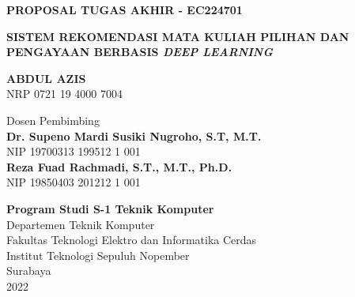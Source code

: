 {

\textbf{\large PROPOSAL TUGAS AKHIR - EC224701}

\vspace{2cm}

\begin{Large}
    \uppercase{\textbf{Sistem rekomendasi Mata Kuliah Pilihan dan Pengayaan berbasis \emph{Deep Learning}}}
\end{Large}

\vspace{2cm}

\begin{large}
    \uppercase{\textbf{Abdul Azis}} \\
    NRP 0721 19 4000 7004

    \vspace{2cm}

    Dosen Pembimbing \\
    \textbf{Dr. Supeno Mardi Susiki Nugroho, S.T, M.T.} \\
    NIP 19700313 199512 1 001 \\

    \textbf{Reza Fuad Rachmadi, S.T., M.T., Ph.D.} \\
    NIP 19850403 201212 1 001 \\

    \vspace{2cm}

    \textbf{Program Studi S-1 Teknik Komputer} \\
    Departemen Teknik Komputer \\
    Fakultas Teknologi Elektro dan Informatika Cerdas \\
    Institut Teknologi Sepuluh Nopember \\

    Surabaya \\
    2022 \\
\end{large}

}
